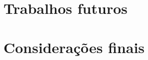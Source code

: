 %
%

\section{Trabalhos futuros}
\label{sec:futuros}

%
%

\section{Considera\c{c}\~oes finais}
\label{sec:final}

%
